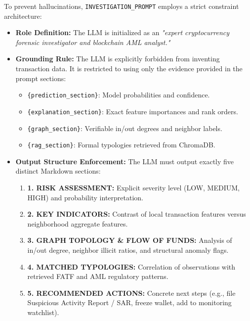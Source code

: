 \documentclass[11pt,a4paper]{report}
\begin{document}
To prevent hallucinations, \texttt{INVESTIGATION\_PROMPT} employs a strict constraint architecture:
\begin{itemize}[leftmargin=1.5em]
  \item \textbf{Role Definition:} The LLM is initialized as an \textit{"expert cryptocurrency forensic investigator and blockchain AML analyst."}
  \item \textbf{Grounding Rule:} The LLM is explicitly forbidden from inventing transaction data. It is restricted to using only the evidence provided in the prompt sections:
  \begin{itemize}
    \item \texttt{\{prediction\_section\}}: Model probabilities and confidence.
    \item \texttt{\{explanation\_section\}}: Exact feature importances and rank orders.
    \item \texttt{\{graph\_section\}}: Verifiable in/out degrees and neighbor labels.
    \item \texttt{\{rag\_section\}}: Formal typologies retrieved from ChromaDB.
  \end{itemize}
  \item \textbf{Output Structure Enforcement:} The LLM must output exactly five distinct Markdown sections:
  \begin{enumerate}
    \item \textbf{1. RISK ASSESSMENT:} Explicit severity level (LOW, MEDIUM, HIGH) and probability interpretation.
    \item \textbf{2. KEY INDICATORS:} Contrast of local transaction features versus neighborhood aggregate features.
    \item \textbf{3. GRAPH TOPOLOGY \& FLOW OF FUNDS:} Analysis of in/out degree, neighbor illicit ratios, and structural anomaly flags.
    \item \textbf{4. MATCHED TYPOLOGIES:} Correlation of observations with retrieved FATF and AML regulatory patterns.
    \item \textbf{5. RECOMMENDED ACTIONS:} Concrete next steps (e.g., file Suspicious Activity Report / SAR, freeze wallet, add to monitoring watchlist).
  \end{enumerate}
\end{itemize}
\end{document}
